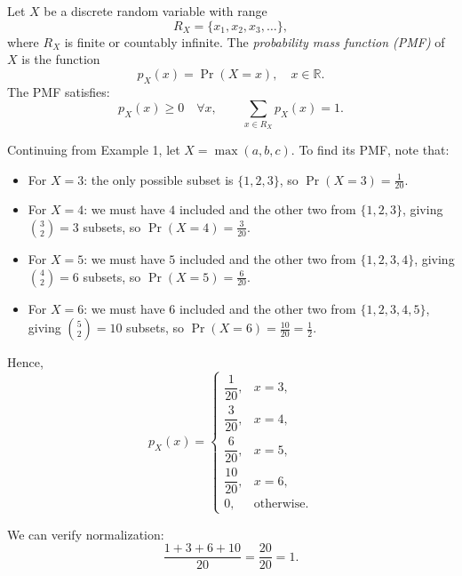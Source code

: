 \begin{definition}
Let \(X\) be a discrete random variable with range
\[
R_X = \{x_1, x_2, x_3, \ldots\},
\]
where \(R_X\) is finite or countably infinite.  
The \emph{probability mass function (PMF)} of \(X\) is the function
\[
p_X(x) = \Pr(X = x), \quad x \in \mathbb{R}.
\]
The PMF satisfies:
\[
p_X(x) \ge 0 \quad \forall x, 
\qquad \sum_{x \in R_X} p_X(x) = 1.
\]
\end{definition}

\begin{eg}
Continuing from Example 1, let \( X = \max(a,b,c) \).  
To find its PMF, note that:

\begin{itemize}
    \item For \(X = 3\): the only possible subset is \(\{1,2,3\}\), so \(\Pr(X=3) = \frac{1}{20}\).
    \item For \(X = 4\): we must have \(4\) included and the other two from \(\{1,2,3\}\), giving \(\binom{3}{2} = 3\) subsets, so \(\Pr(X=4) = \frac{3}{20}\).
    \item For \(X = 5\): we must have \(5\) included and the other two from \(\{1,2,3,4\}\), giving \(\binom{4}{2} = 6\) subsets, so \(\Pr(X=5) = \frac{6}{20}\).
    \item For \(X = 6\): we must have \(6\) included and the other two from \(\{1,2,3,4,5\}\), giving \(\binom{5}{2} = 10\) subsets, so \(\Pr(X=6) = \frac{10}{20} = \frac{1}{2}\).
\end{itemize}

Hence,
\[
p_X(x) =
\begin{cases}
\dfrac{1}{20}, & x = 3, \\[6pt]
\dfrac{3}{20}, & x = 4, \\[6pt]
\dfrac{6}{20}, & x = 5, \\[6pt]
\dfrac{10}{20}, & x = 6, \\[6pt]
0, & \text{otherwise.}
\end{cases}
\]

We can verify normalization:
\[
\frac{1 + 3 + 6 + 10}{20} = \frac{20}{20} = 1.
\]
\end{eg}


